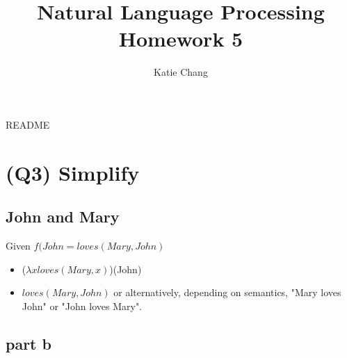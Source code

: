 \documentclass[12pt, letterpaper]{article}
\title{Natural Language Processing Homework 5}
\author{Katie Chang}
\begin{document}
\maketitle

README






\section{(Q3) Simplify}

\subsection{John and Mary}
Given $f(John = loves(Mary, John)$

\begin{itemize}  
\item ($\lambda x loves(Mary,x)$)(John)
\item $loves(Mary, John)$ or alternatively, depending on semantics, "Mary loves John" or "John loves Mary".
\end{itemize}

\subsection{part b}

\end{document}

